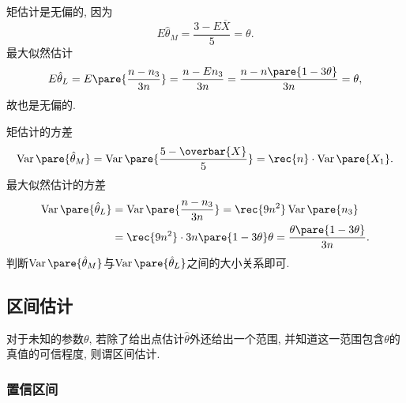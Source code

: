 \documentclass{ctexart}
\DeclareMathOperator{\Var}{Var}
\begin{document}
\begin{sample}
\begin{ex}
\begin{cenum}
            \item 矩估计是无偏的, 因为
            \[ E\hat{\theta}_M = \frac{3-E\overbar{X}}{5} = \theta. \]
            最大似然估计
            \[ E\hat{\theta}_L = E\pare{\frac{n-n_3}{3n}} = \frac{n - En_3}{3n} = \frac{n - n\pare{1-3\theta}}{3n} = \theta, \]
            故也是无偏的.
            \item 矩估计的方差
            \[ \Var\pare{\hat\theta_M} = \Var\pare{\frac{5-\overbar{X}}{5}} = \rec{n}\cdot\Var\pare{X_1}. \]
            最大似然估计的方差
            \begin{align*}
                \Var\pare{\hat\theta_L} &= \Var\pare{\frac{n-n_3}{3n}} = \rec{9n^2}\Var\pare{n_3}\\ &= \rec{9n^2} \cdot 3n\pare{1-3\theta}\theta = \frac{\theta\pare{1-3\theta}}{3n}.
            \end{align*}
            判断$\Var\pare{\hat\theta_M}$与$\Var\pare{\hat\theta_L}$之间的大小关系即可.
        \end{cenum}
    \end{ex}
\end{sample}



\subsection{区间估计} %
\label{sub:区间估计}

对于未知的参数$\theta$, 若除了给出点估计$\hat\theta$外还给出一个范围, 并知道这一范围包含$\theta$的真值的可信程度, 则谓区间估计.

\subsubsection{置信区间} %
\label{ssub:置信区间}
\end{document}

